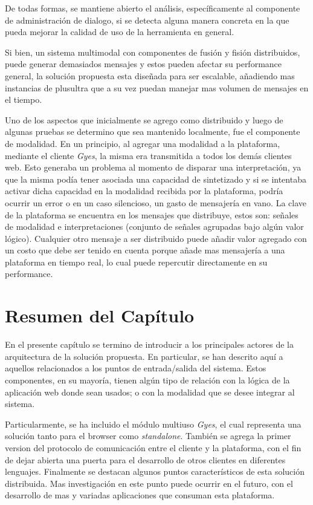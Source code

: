De todas formas, se mantiene abierto el análisis, específicamente al componente de administración de dialogo, si se detecta alguna manera concreta en la que pueda mejorar la calidad de uso de la herramienta en general.

Si bien, un sistema multimodal con componentes de fusión y fisión distribuidos, puede generar demasiados mensajes y estos pueden afectar su performance general, la solución propuesta esta diseñada para ser escalable, añadiendo mas instancias de plusultra que a su vez puedan manejar mas volumen de mensajes en el tiempo. 

Uno de los aspectos que inicialmente se agrego como distribuido y luego de algunas pruebas se determino que sea mantenido localmente, fue el componente de modalidad. En un principio, al agregar una modalidad a la plataforma, mediante el cliente \emph{Gyes}, la misma era transmitida a todos los demás clientes web. Esto generaba un problema al momento de disparar una interpretación, ya que la misma podía tener asociada una capacidad de sintetizado y si se intentaba activar dicha capacidad en la modalidad recibida por la plataforma, podría ocurrir un error o en un caso silencioso, un gasto de mensajería en vano.
La clave de la plataforma se encuentra en los mensajes que distribuye, estos son: señales de modalidad e interpretaciones (conjunto de señales agrupadas bajo algún valor lógico). Cualquier otro mensaje a ser distribuido puede añadir valor agregado con un costo que debe ser tenido en cuenta porque añade mas mensajería a una plataforma en tiempo real, lo cual puede repercutir directamente en su performance. 


\section{Resumen del Capítulo} \label{sec:enlace_summary}
En el presente capítulo se termino de introducir a los principales actores de la arquitectura de la solución propuesta. En particular, se han descrito aquí a aquellos relacionados a los puntos de entrada/salida del sistema. Estos componentes, en su mayoría, tienen algún tipo de relación con la lógica de la aplicación web donde sean usados; o con la modalidad que se desee integrar al sistema. 

Particularmente, se ha incluido el módulo multiuso \emph{Gyes}, el cual representa una solución tanto para el browser como \emph{standalone}. También se agrega la primer version del protocolo de comunicación entre el cliente y la plataforma, con el fin de dejar abierta una puerta para el desarrollo de otros clientes en diferentes lenguajes. Finalmente se destacan algunos puntos característicos de esta solución distribuida. Mas investigación en este punto puede ocurrir en el futuro, con el desarrollo de mas y variadas aplicaciones que consuman esta plataforma.

